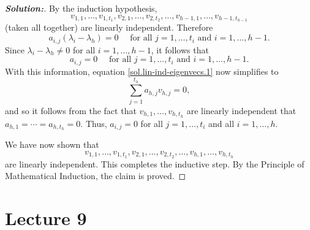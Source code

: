 \documentclass[a4paper]{amsart}
\theoremstyle{definition}
\newenvironment{solution}{\begin{proof}[\textbf{Solution:}] \vphantom{u}}{\end{proof}}
\begin{document}
\begin{solution}
 By the induction hypothesis, $$
 v_{1,1}, \ldots, v_{1,t_1},
 v_{2,1}, \ldots, v_{2,t_2},
 \ldots,
 v_{h-1,1}, \ldots, v_{h-1,t_{h-1}}
 $$
 (taken all together) are linearly independent. Therefore
 $$
 a_{i,j}(\lambda_i - \lambda_h) = 0 \quad \text{~for all~} j = 1,
 \ldots, t_i
 \text{~and~} i = 1, \ldots, h-1.
 $$
 Since $\lambda_i - \lambda_h \neq 0$ for all $i = 1, \ldots, h-1$, it follows that
 $$
 a_{i,j} = 0 \quad \text{~for all~} j = 1, \ldots, t_i
 \text{~and~} i = 1, \ldots, h-1.
 $$
 With this information, equation \eqref{sol.lin-ind-eigenvecs.1} now simplifies to
 $$
 \sum_{j=1}^{t_h} a_{h,j}v_{h,j} = 0,
 $$
 and so it follows from the fact that $v_{h,1}, \ldots, v_{h,t_h}$ are
 linearly independent that $a_{h,1}= \cdots = a_{h,t_h} = 0$.
 Thus, $a_{i,j} = 0$ for all $j = 1, \ldots, t_i$
 and all $i = 1, \ldots, h$.

 We have now shown that
 $$
 v_{1,1}, \ldots, v_{1,t_1},
 v_{2,1}, \ldots, v_{2,t_2},
 \ldots,
 v_{h,1}, \ldots, v_{h,t_h}
 $$
 are linearly independent. This completes the inductive step. By the
 Principle of
 Mathematical Induction, the claim is proved.

\end{solution}

\section{Lecture 9}
\end{document}
